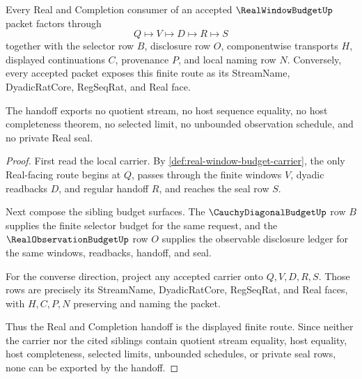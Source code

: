 \begin{theorem}
\label{thm:real-window-budget-real-completion-handoff}
Every Real and Completion consumer of an accepted $\RealWindowBudgetUp$ packet factors through
$$
Q \longmapsto V \longmapsto D \longmapsto R \longmapsto S
$$
together with the selector row $B$, disclosure row $O$, componentwise transports $H$, displayed continuations $C$, provenance $P$, and local naming row $N$. Conversely, every accepted packet exposes this finite route as its StreamName, DyadicRatCore, RegSeqRat, and Real face.

The handoff exports no quotient stream, no host sequence equality, no host completeness theorem, no selected limit, no unbounded observation schedule, and no private Real seal.
\end{theorem}
\begin{proof}
First read the local carrier. By \autoref{def:real-window-budget-carrier}, the only Real-facing route begins at $Q$, passes through the finite windows $V$, dyadic readbacks $D$, and regular handoff $R$, and reaches the seal row $S$.

Next compose the sibling budget surfaces. The $\CauchyDiagonalBudgetUp$ row $B$ supplies the finite selector budget for the same request, and the $\RealObservationBudgetUp$ row $O$ supplies the observable disclosure ledger for the same windows, readbacks, handoff, and seal.

For the converse direction, project any accepted carrier onto $Q,V,D,R,S$. Those rows are precisely its StreamName, DyadicRatCore, RegSeqRat, and Real faces, with $H,C,P,N$ preserving and naming the packet.

Thus the Real and Completion handoff is the displayed finite route. Since neither the carrier nor the cited siblings contain quotient stream equality, host equality, host completeness, selected limits, unbounded schedules, or private seal rows, none can be exported by the handoff.
\end{proof}

